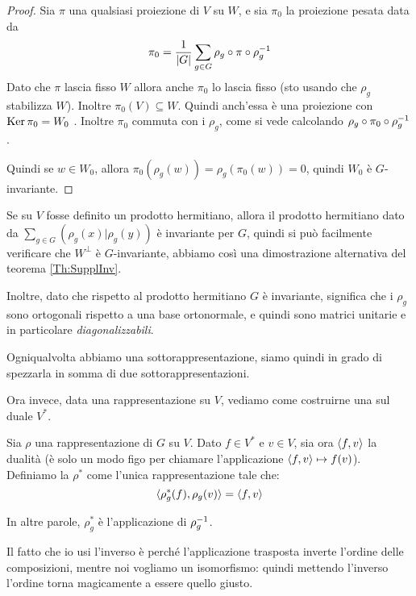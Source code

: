 \documentclass[a4paper,10pt,oneside]{math_article}
\newcommand{\herm}[2]{\left(#1 | #2\right)}
\begin{document}
    \begin{proof}
     Sia $\pi$ una qualsiasi proiezione di $V$ su $W$, e sia $\pi_0$ la proiezione pesata data da
     \[
      \pi_0=\frac1{\left|G\right|} \sum_{g\in G} \rho_g \circ \pi \circ \rho_g^{-1}
     \]
     Dato che $\pi$ lascia fisso $W$ allora anche $\pi_0$ lo lascia fisso (sto usando che $\rho_g$ stabilizza $W$). Inoltre $\pi_0(V) \subseteq W$. Quindi anch'essa è una proiezione con $\operatorname{Ker} \pi_0=W_0$ . Inoltre $\pi_0$ commuta con i $\rho_g$, come si vede calcolando $\rho_g \circ \pi_0 \circ \rho_g^{-1}$.
     
     Quindi se $w\in W_0$, allora $\pi_0 (\rho_g(w))=\rho_g(\pi_0(w))=0$, quindi $W_0$ è $G$-invariante.
    \end{proof}
    \begin{myobs}
     Se su $V$ fosse definito un prodotto hermitiano, allora il prodotto hermitiano dato da $\sum_{g\in G}\herm {\rho_g(x)}{\rho_g(y)}$ è invariante per $G$, quindi si può facilmente verificare che $W^\perp$ è $G$-invariante, abbiamo così una dimostrazione alternativa del teorema \ref{Th:SupplInv}.
     
     Inoltre, dato che rispetto al prodotto hermitiano $G$ è invariante, significa che i $\rho_g$ sono ortogonali rispetto a una base ortonormale, e quindi sono matrici unitarie e in particolare \emph{diagonalizzabili}.
    \end{myobs}

    Ogniqualvolta abbiamo una sottorappresentazione, siamo quindi in grado di spezzarla in somma di due sottorappresentazioni.
    
    Ora invece, data una rappresentazione su $V$, vediamo come costruirne una sul duale $V^*$.
    \begin{mydef}
     Sia $\rho$ una rappresentazione di $G$ su $V$. Dato $f\in V^*$ e $v\in V$, sia ora $\langle f , v\rangle$ la dualità (è solo un modo figo per chiamare l'applicazione $\langle f , v\rangle \mapsto f(v)$). Definiamo la  $\rho^*$ come l'unica rappresentazione tale che:
     \[
      \langle\rho^*_g(f) , \rho_g (v)\rangle=\langle f , v\rangle
     \]
    \end{mydef}
    
    In altre parole, $\rho^*_g$ è l'applicazione  di $\rho_g^{-1}$.

    Il fatto che io usi l'inverso è perché l'applicazione trasposta inverte l'ordine delle composizioni, mentre noi vogliamo un isomorfismo: quindi mettendo l'inverso l'ordine torna magicamente a essere quello giusto.
    
\end{document}
